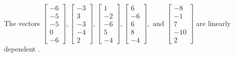 \begin{exercise}
\begin{exerciseStatement}
  \end{exerciseStatement}
  \begin{exerciseAnswer}
   The vectors \(\left[\begin{array}{r}
-6 \\
-5 \\
-5 \\
0 \\
-6
\end{array}\right] , \left[\begin{array}{r}
-3 \\
3 \\
-3 \\
-4 \\
2
\end{array}\right] , \left[\begin{array}{r}
1 \\
-2 \\
-6 \\
5 \\
-4
\end{array}\right] , \left[\begin{array}{r}
6 \\
-6 \\
6 \\
8 \\
-4
\end{array}\right] , \text{ and } \left[\begin{array}{r}
-8 \\
-1 \\
7 \\
-10 \\
2
\end{array}\right]\) are 
  	 linearly dependent  .
  


  \end{exerciseAnswer}
\end{exercise}